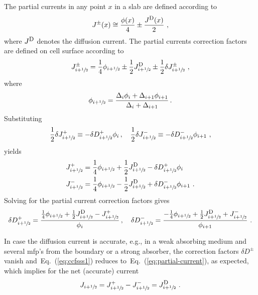\documentclass[letterpaper]{physor2020}
\newcommand{\eq}[1]{Eq.~(\ref{#1})}
\newcommand{\jp}{\ensuremath{J^+}}
\newcommand{\jm}{\ensuremath{J^-}}
\newcommand{\jpm}{\ensuremath{J^\pm}}
\newcommand{\jD}{\ensuremath{J^{\textrm{\scriptsize{D}}}}}
\newcommand{\hzi}{\ensuremath{\sfrac{1}{2}}}
\begin{document}
The partial currents in any point $x$ in a slab are defined according to
\begin{equation}
\label{eq:partial-current}
\jpm (x) \cong \frac{\phi(x)}{4} \pm \frac{\jD (x)}{2} \,\, ,
\end{equation}
where $\jD$ denotes the diffusion current.
The partial currents correction factors are defined on cell surface according to
\begin{equation}
\label{eq:PCCF}
\jpm _{i+\hzi} = \frac{1}{4}\phi_{i+\hzi}
\pm \frac{1}{2} \jD _{i+\hzi} \pm \frac{1}{2} \delta \jpm _{i+\hzi} \,\, ,
\end{equation}
where
\begin{equation}
\label{eq:jdiff}
\phi_{i+\hzi} = \frac{\Delta_i \phi_i + \Delta_{i+1} \phi_{i+1}}{\Delta_i + \Delta_{i+1}} \, .
\end{equation}
Substituting~\cite{Jarrett-2016,Zhu-2016}
\begin{equation}
\label{eq:CCF-sub}
\frac{1}{2} \delta \jp _{i+\hzi} \equiv -\delta D^+ _{i+\hzi} \phi_i \,, 
\quad
\frac{1}{2} \delta \jm _{i+\hzi} \equiv -\delta D^- _{i+\hzi} \phi_{i+1}\,\, ,
\end{equation}
yields
\begin{align}
\label{eq:par4}
\jp _{i+\hzi} &= \frac{1}{4}\phi_{i+\hzi}
+ \frac{1}{2}\jD _{i+\hzi} - \delta D^+ _{i+\hzi} \phi_i \\
\jm _{i+\hzi} &= \frac{1}{4}\phi_{i+\hzi}
- \frac{1}{2}\jD _{i+\hzi} + \delta D^- _{i+\hzi} \phi_{i+1} \,\, .
\end{align}
%
Solving for the partial current correction factors gives
\begin{equation}
\label{eq:ccfsss1}
\delta D^+ _{i+\hzi} = \frac{\frac{1}{4}\phi_{i+\hzi}
	+ \frac{1}{2}\jD _{i+\hzi} - \jp _{i+\hzi}}{\phi_i} \,, \quad
\delta D^- _{i+\hzi} = \frac{-\frac{1}{4}\phi_{i+\hzi}
	+ \frac{1}{2}\jD _{i+\hzi} + \jm _{i+\hzi}}{\phi_{i+1}} \,\, .
\end{equation}

In case the diffusion current is accurate, e.g., in a weak absorbing medium and several mfp's from the boundary or a strong absorber, the correction factors $\delta D^\pm$ vanish and~\eq{eq:ccfsss1} reduces to~\eq{eq:partial-current}, as expected, which implies for the net (accurate) current 
\begin{equation}
J _{i+\hzi} = \jp _{i+\hzi} - \jm _{i+\hzi} = \jD _{i+\hzi} \,\, .
\end{equation} 
\end{document}
